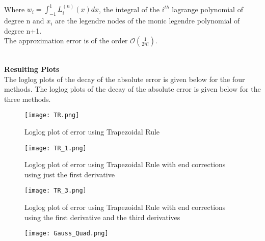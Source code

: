 \documentclass[letterpaper]{exam}
\begin{document}
\begin{questions}
\begin{solution}
\begin{itemize}
\begin{align}
            \end{align}
            Where $w_i = \int_{-1}^{1} L_i^{(n)}(x) dx$, the integral of the $i^{th}$ lagrange polynomial of degree n and $x_i$ are the legendre nodes of the monic legendre polynomial of degree n+1.\\
            The approximation error is of the order $\mathcal{O}\left(\frac{1}{2n!}\right)$.
\end{itemize}
\end{solution}
\newpage
\begin{solution}
\\
\textbf{Resulting Plots}\\
The loglog plots of the decay of the absolute error is given below for the four methods.
The loglog plots of the decay of the absolute error is given below for the three methods.
\begin{figure}[H]  
     \centering
    \texttt{[image: TR.png]}
     \label{fig:Dendrogram for the problem 3(c)}
     \caption{Loglog plot of error using Trapezoidal Rule}
\end{figure}
\begin{figure}[H]  
     \centering
    \texttt{[image: TR\_1.png]}
     \label{fig:Dendrogram for the problem 3(c)}
     \caption{Loglog plot of error using Trapezoidal Rule with end corrections using just the first derivative}
\end{figure}
\begin{figure}[H]  
     \centering
    \texttt{[image: TR\_3.png]}
     \label{fig:Dendrogram for the problem 3(c)}
     \caption{Loglog plot of error using Trapezoidal Rule with end corrections using the first derivative and the third derivatives}
\end{figure}
\begin{figure}[H]  
     \centering
    \texttt{[image: Gauss\_Quad.png]}
     \label{fig:Dendrogram for the problem 3(c)}

\end{figure}
\end{solution}
\end{questions}
\end{document}
